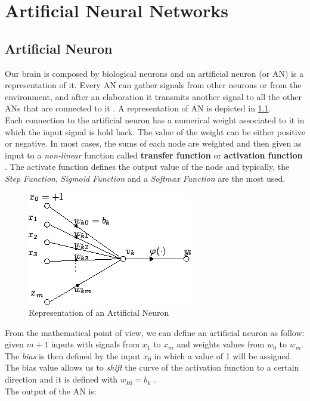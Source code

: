 \chapter{Artificial Neural Networks}
\section{Artificial Neuron}
Our brain is composed by biological neurons and an artificial neuron (or AN) is a representation of it. Every AN can gather signals from other neurons or from the environment, and after an elaboration it transmits another signal to all the other ANs that are connected to it \cite{engelbrecht2007computational}. A representation of AN is depicted in \ref{fig:artificial_neuron}. \\
Each connection to the artificial neuron has a numerical weight associated to it in which the input signal is hold back. The value of the weight can be either positive or negative. In most cases, the sums of each node are weighted and then given as input to a \textit{non-linear} function called \textbf{transfer function} or \textbf{activation function} \cite{artificial_neuron_wiki}. The activate function defines the output value of the node and typically, the \textit{Step Function}, \textit{Sigmoid Function} and a \textit{Softmax Function} are the most used.

\begin{figure}[!ht]
    \centering
    \includegraphics[scale=0.5]{Figures/artificial_neuron.png}
    \caption{Representation of an Artificial Neuron \cite{artificial_neuron_wiki}}
    \label{fig:artificial_neuron}
\end{figure}

\noindent From the mathematical point of view, we can define an artificial neuron as follow: \\
given $m+1$ inputs with signals from $x_1$ to $x_m$ and weights values from $w_0$ to $w_m$. The \textit{bias} is then defined by the input $x_0$ in which a value of 1 will be assigned. The bias value allows us to \textit{shift} the curve of the activation function to a certain direction and it is defined with $w_{k0} = b_k$ \cite{artificial_neuron_wiki}. \\
The output of the AN is:

